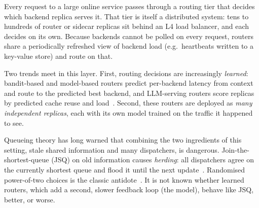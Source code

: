 \documentclass[10pt,twocolumn,letterpaper]{article}
\begin{document}
Every request to a large online service passes through a routing tier that
decides which backend replica serves it. That tier is itself a distributed
system: tens to hundreds of router or sidecar replicas sit behind an L4 load
balancer, and each decides on its own. Because backends cannot be polled on
every request, routers share a periodically refreshed view of backend load
(e.g.\ heartbeats written to a key-value store) and route on that.

Two trends meet in this layer. First, routing decisions are increasingly
\emph{learned}: bandit-based and model-based routers predict per-backend latency
from context and route to the predicted best backend, and LLM-serving routers
score replicas by predicted cache reuse and load~\citep{llmd,vllmrouter,lodestar2026}.
Second, these routers are deployed as \emph{many independent replicas}, each
with its own model trained on the traffic it happened to see.

Queueing theory has long warned that combining the two ingredients of this
setting, stale shared information and many dispatchers, is dangerous.
Join-the-shortest-queue (JSQ) on old information causes \emph{herding}: all
dispatchers agree on the currently shortest queue and flood it until the next
update~\citep{mitzenmacher2000old,dahlin2000stale}. Randomised power-of-two
choices is the classic antidote~\citep{mitzenmacher2001power}. It is not known
whether learned routers, which add a second, slower feedback loop (the model),
behave like JSQ, better, or worse.
\end{document}
